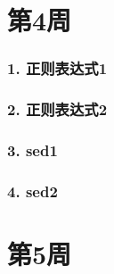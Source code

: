\documentclass[bigger]{beamer}
\begin{document}
\section{第4周}
\label{sec-4}
\begin{frame}
\frametitle{1. 正则表达式1}
\label{sec-4-1}
\end{frame}
\begin{frame}
\frametitle{2. 正则表达式2}
\label{sec-4-2}
\end{frame}
\begin{frame}
\frametitle{3. sed1}
\label{sec-4-3}
\end{frame}
\begin{frame}
\frametitle{4. sed2}
\label{sec-4-4}
\end{frame}
\section{第5周}
\label{sec-5}
\end{document}
